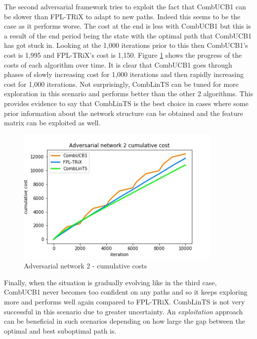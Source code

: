 The second adversarial framework tries to exploit the fact that CombUCB1 can be slower than FPL-TRiX to adapt to new paths. Indeed this seems to be the case as it performs worse. The cost at the end is less with CombUCB1 but this is a result of the end period being the state with the optimal path that CombUCB1 has got stuck in. Looking at the 1,000 iterations prior to this then CombUCB1's cost is 1,995 and FPL-TRiX's cost is 1,150. Figure \ref{fig:cumul_costs} shows the progress of the costs of each algorithm over time. It is clear that CombUCB1 goes through phases of slowly increasing cost for 1,000 iterations and then rapidly increasing cost for 1,000 iterations. Not surprisingly, CombLinTS can be tuned for more exploration in this scenario and performs better than the other 2 algorithms. This provides evidence to say that CombLinTS is the best choice in cases where some prior information about the network structure can be obtained and the feature matrix can be exploited as well.\\

\begin{figure}[ht!]%
  \centering
  \includegraphics[width=10cm]{../plots/advers_net2_cumul_costs.jpg}
  \caption{Adversarial network 2 - cumulative costs}
  \label{fig:cumul_costs}
\end{figure}

Finally, when the situation is gradually evolving like in the third case, CombUCB1 never becomes too confident on any paths and so it keeps exploring more and performs well again compared to FPL-TRiX. CombLinTS is not very successful in this scenario due to greater uncertainty. An \emph{exploitation} approach can be beneficial in such scenarios depending on how large the gap between the optimal and best suboptimal path is.\\


\pagebreak

